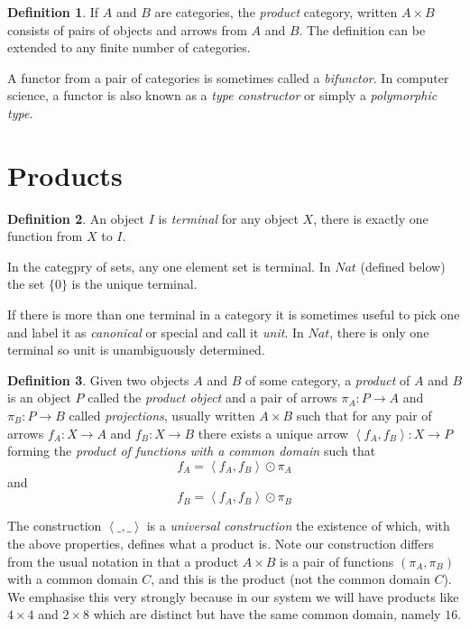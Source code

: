 \documentclass[oneside]{book}
\theoremstyle{plain}
\theoremstyle{definition}
\newtheorem{definition}{Definition}
\theoremstyle{plain}
\def\Nat{\mathit{Nat}}
\def\leftangle{\left<}
\def\rightangle{\right>}
\begin{document}
\begin{definition}
If $A$ and $B$ are categories, the {\em product} category, written $A\times B$
consists of pairs of objects and arrows from $A$ and $B$. The definition
can be extended to any finite number of categories.
\end{definition}

A functor from a pair of categories is sometimes called a {\em bifunctor}.
In computer science, a functor is also known as a {\em type constructor}
or simply a {\em polymorphic type}.

\section{Products}
\begin{definition}
An object $I$ is {\em terminal} 
for any object $X$, there is exactly
one function from $X$ to $I$.
\end{definition}

In the categpry of sets, any one element set is terminal.
In $\Nat$ (defined below) the set $\{0\}$ is the unique terminal.

If there is more than one terminal in a category it is sometimes
useful to pick one and label it as {\em canonical} or special
and call it {\em unit}. In $Nat$, there is only one terminal
so unit is unambiguously determined.

\begin{definition}
Given two objects $A$ and $B$ of some category, a {\em product} of $A$ and $B$
is an object $P$ called the {\em product object} and a 
pair of arrows $\pi_A:P \rightarrow A$ and $\pi_B: P \rightarrow B$ called {\em projections}, 
usually written $A \times B$ such that for any pair of arrows $f_A:X \rightarrow A$ and
$f_B: X \rightarrow B$ there exists a unique arrow  
$\leftangle f_A, f_B \rightangle: X \rightarrow P$ forming the {\em product of functions
with a common domain} such that
$$f_A = \leftangle f_A, f_B \rightangle \odot \pi_A$$ 
and
$$f_B = \leftangle f_A, f_B \rightangle \odot \pi_B$$ 
\end{definition}
The construction 
$\leftangle \_, \_ \rightangle$ is a {\em universal construction} the existence 
of which, with the above properties, defines what a product is. Note our 
construction differs from the usual notation in that a product $A\times B$
is a pair of functions $(\pi_A, \pi_B)$ with a common domain $C$, and this
is the product (not the common domain $C$). We emphasise this very strongly
because in our system we will have products like $4\times4$ and $2\times8$
which are distinct but have the same common domain, namely $16$.
\end{document}
